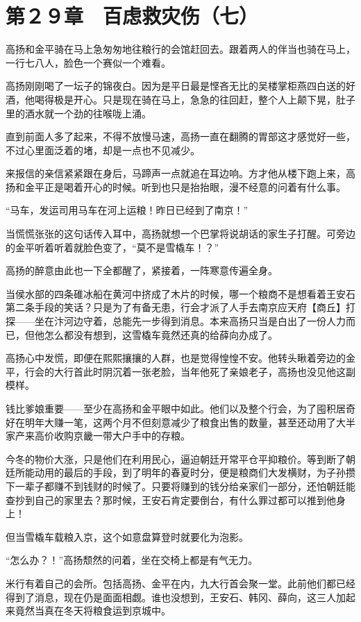 \section{第２９章　百虑救灾伤（七）}

高扬和金平骑在马上急匆匆地往粮行的会馆赶回去。跟着两人的伴当也骑在马上，一行七八人，脸色一个赛似一个难看。

高扬刚刚喝了一坛子的锦夜白。因为是平日最是悭吝无比的吴楼掌柜燕四白送的好酒，他喝得极是开心。只是现在骑在马上，急急的往回赶，整个人上颠下晃，肚子里的酒水就一个劲的往喉咙上涌。

直到前面人多了起来，不得不放慢马速，高扬一直在翻腾的胃部这才感觉好一些，不过心里面泛着的堵，却是一点也不见减少。

来报信的亲信紧紧跟在身后，马蹄声一点就追在耳边响。方才他从楼下跑上来，高扬和金平正是喝着开心的时候。听到也只是抬抬眼，漫不经意的问着有什么事。

“马车，发运司用马车在河上运粮！昨日已经到了南京！”

当慌慌张张的这句话传入耳中，高扬就想一个巴掌将说胡话的家生子打醒。可旁边的金平听着听着就脸色变了，“莫不是雪橇车！？”

高扬的醉意由此也一下全都醒了，紧接着，一阵寒意传遍全身。

当侯水部的四条碓冰船在黄河中挤成了木片的时候，哪一个粮商不是想看着王安石第二条手段的笑话？只是为了有备无患，行会才派了人手去南京应天府【商丘】打探——坐在汴河边守着，总能先一步得到消息。本来高扬只当是白出了一份人力而已，但他怎么都没有想到，这雪橇车竟然还真的给薛向办成了。

高扬心中发慌，即便在熙熙攘攘的人群，也是觉得惶惶不安。他转头瞅着旁边的金平，行会的大行首此时阴沉着一张老脸，当年他死了亲娘老子，高扬也没见他这副模样。

钱比爹娘重要——至少在高扬和金平眼中如此。他们以及整个行会，为了囤积居奇好在明年大赚一笔，这两个月不但刻意减少了粮食出售的数量，甚至还动用了大半家产来高价收购京畿一带大户手中的存粮。

今冬的物价大涨，只是他们在利用民心，逼迫朝廷开常平仓平抑粮价。等到断了朝廷所能动用的最后的手段，到了明年的春夏时分，便是粮商们大发横财，为子孙攒下一辈子都赚不到钱财的时候了。只要将赚到的钱分给亲家们一部分，还怕朝廷能查抄到自己的家里去？那时候，王安石肯定要倒台，有什么罪过都可以推到他身上！

但当雪橇车载粮入京，这个如意盘算登时就要化为泡影。

“怎么办？！”高扬颓然的问着，坐在交椅上都是有气无力。

米行有着自己的会所。包括高扬、金平在内，九大行首会聚一堂。此前他们都已经得到了消息，现在仍是面面相觑。谁也没想到，王安石、韩冈、薛向，这三人加起来竟然当真在冬天将粮食运到京城中。

